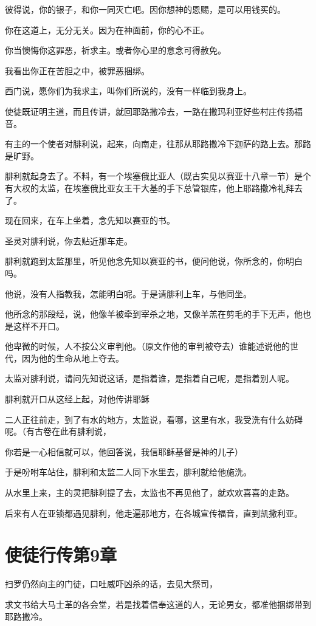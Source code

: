 \documentclass[12pt,oneside]{book}
\begin{document}
彼得说，你的银子，和你一同灭亡吧。因你想神的恩赐，是可以用钱买的。

你在这道上，无分无关。因为在神面前，你的心不正。

你当懊悔你这罪恶，祈求主。或者你心里的意念可得赦免。

我看出你正在苦胆之中，被罪恶捆绑。

西门说，愿你们为我求主，叫你们所说的，没有一样临到我身上。

使徒既证明主道，而且传讲，就回耶路撒冷去，一路在撒玛利亚好些村庄传扬福音。

有主的一个使者对腓利说，起来，向南走，往那从耶路撒冷下迦萨的路上去。那路是旷野。

腓利就起身去了。不料，有一个埃塞俄比亚人（既古实见以赛亚十八章一节）是个有大权的太监，在埃塞俄比亚女王干大基的手下总管银库，他上耶路撒冷礼拜去了。

现在回来，在车上坐着，念先知以赛亚的书。

圣灵对腓利说，你去贴近那车走。

腓利就跑到太监那里，听见他念先知以赛亚的书，便问他说，你所念的，你明白吗。

他说，没有人指教我，怎能明白呢。于是请腓利上车，与他同坐。

他所念的那段经，说，他像羊被牵到宰杀之地，又像羊羔在剪毛的手下无声，他也是这样不开口。

他卑微的时候，人不按公义审判他。（原文作他的审判被夺去）谁能述说他的世代，因为他的生命从地上夺去。

太监对腓利说，请问先知说这话，是指着谁，是指着自己呢，是指着别人呢。

腓利就开口从这经上起，对他传讲耶稣

二人正往前走，到了有水的地方，太监说，看哪，这里有水，我受洗有什么妨碍呢。（有古卷在此有腓利说，

你若是一心相信就可以，他回答说，我信耶稣基督是神的儿子）

于是吩咐车站住，腓利和太监二人同下水里去，腓利就给他施洗。

从水里上来，主的灵把腓利提了去，太监也不再见他了，就欢欢喜喜的走路。

后来有人在亚锁都遇见腓利，他走遍那地方，在各城宣传福音，直到凯撒利亚。

\chapter{使徒行传第9章}
扫罗仍然向主的门徒，口吐威吓凶杀的话，去见大祭司，

求文书给大马士革的各会堂，若是找着信奉这道的人，无论男女，都准他捆绑带到耶路撒冷。
\end{document}
